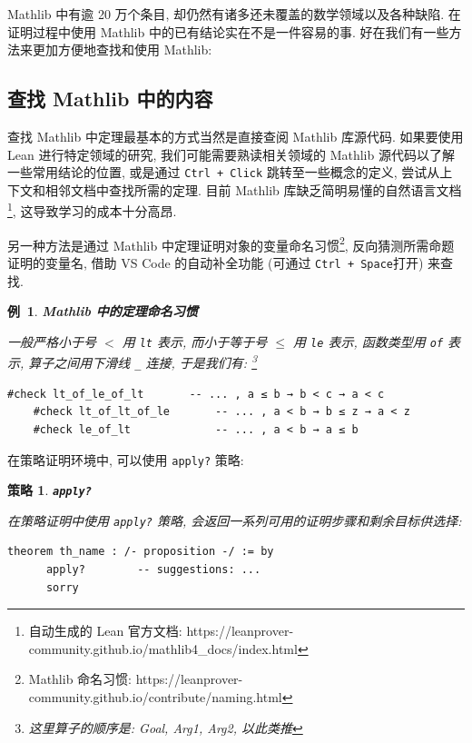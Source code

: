 \documentclass[UTF8]{ctexart}
\DeclareMathOperator{\0}{\mathbf{0}}                    %
\newcommand{\<}{\langle}
\renewcommand{\>}{\rangle}                              %
\newenvironment{thm_box}{
    \begin{tcolorbox}[enhanced, colback=thm_blue2, boxrule=0pt, frame hidden,
        borderline west={0.7mm}{0.1mm}{thm_blue1},breakable]
    }
    {\end{tcolorbox}}
\newenvironment{xmp_box}{
    \begin{tcolorbox}[enhanced, colback=xmp_purple2, boxrule=0pt, frame hidden,
        borderline west={0.7mm}{0.1mm}{xmp_purple1},breakable]
    }
    {\end{tcolorbox}}
\theoremstyle{MyStyle} %
\newtheorem{mytactic}{策略}
\newenvironment{tactic}[1]
{
    \begin{thm_box}
        \begin{mytactic}
            \textbf{#1}
            \newline
}
{
        \end{mytactic}
    \end{thm_box}
}
\newtheorem{example}{ 例\, }[subsection]
\newenvironment{xmp}[1]
{
    \begin{xmp_box}
        \begin{example}
            \textbf{#1}
            \newline
}
{
        \end{example}
    \end{xmp_box}
}
\newcommand*{\lean}[1]{\texttt{\color{blue}#1}}
\begin{document}
        Mathlib 中有逾 20 万个条目, 却仍然有诸多还未覆盖的数学领域以及各种缺陷. 在证明过程中使用 Mathlib 中的已有结论实在不是一件容易的事. 好在我们有一些方法来更加方便地查找和使用 Mathlib: 

    \subsection{查找 Mathlib 中的内容}

        查找 Mathlib 中定理最基本的方式当然是直接查阅 Mathlib 库源代码. 如果要使用 Lean 进行特定领域的研究, 我们可能需要熟读相关领域的 Mathlib 源代码以了解一些常用结论的位置, 或是通过 \texttt{Ctrl + Click} 跳转至一些概念的定义, 尝试从上下文和相邻文档中查找所需的定理. 目前 Mathlib 库缺乏简明易懂的自然语言文档\footnote{自动生成的 Lean 官方文档: https://leanprover-community.github.io/mathlib4\_docs/index.html}, 这导致学习的成本十分高昂. 

        另一种方法是通过 Mathlib 中定理证明对象的变量命名习惯\footnote{Mathlib 命名习惯: https://leanprover-community.github.io/contribute/naming.html}, 反向猜测所需命题证明的变量名, 借助 VS Code 的自动补全功能 (可通过 \texttt{Ctrl + Space}打开) 来查找. 

        \begin{xmp}
            {Mathlib 中的定理命名习惯}
            一般严格小于号 $<$ 用 \texttt{lt} 表示, 而小于等于号 $\leq$ 用 \texttt{le} 表示, 函数类型用 \texttt{of} 表示, 算子之间用下滑线 \texttt{\_} 连接, 于是我们有: \footnote{这里算子的顺序是: Goal, Arg1, Arg2, 以此类推}
            \begin{lstlisting}[style=lean]
    #check lt_of_le_of_lt       -- ... , a ≤ b → b < c → a < c
    #check lt_of_lt_of_le       -- ... , a < b → b ≤ z → a < z
    #check le_of_lt             -- ... , a < b → a ≤ b
            \end{lstlisting}
        \end{xmp}

        在策略证明环境中, 可以使用 \lean{apply?} 策略: 
        
        \begin{tactic}
            {\lean{apply?}}
            在策略证明中使用 \lean{apply?} 策略, 会返回一系列可用的证明步骤和剩余目标供选择: 
            \begin{lstlisting}[style=lean]
    theorem th_name : /- proposition -/ := by
      apply?        -- suggestions: ...
      sorry
            \end{lstlisting}
        \end{tactic}
\end{document}
